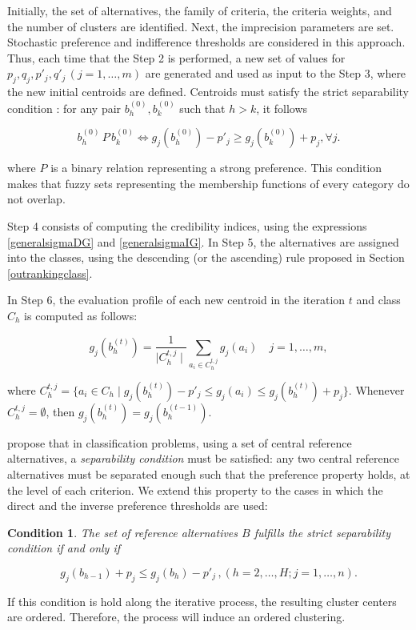 \documentclass[]{elsarticle}
\theoremstyle{definition}
\newtheorem{cond}{Condition}
\begin{document}
Initially, the set of alternatives, the family of criteria, the criteria weights, and the number of clusters are identified.  Next, the imprecision parameters are set. Stochastic preference and indifference thresholds are considered in this approach. Thus, each time that the Step 2 is performed, a new set of values for $p_j,q_j,p'_j,q'_j \,(j=1,\ldots,m)$ are generated and used as input to the Step 3, where the new initial centroids are defined. Centroids  must satisfy the strict separability condition \citep{roy2012}:  for any pair $b_h^{(0)}, b_k^{(0)}$ such that $h>k$, it follows 

\begin{equation}
b_h^{(0)} \,P\, b_k^{(0)} \Leftrightarrow g_j(b_h^{(0)})-p'_j \geq g_j(b_k^{(0)})+p_j, \forall j.
\end{equation}

\noindent
where $P$ is a binary relation representing a strong preference.  This condition makes that fuzzy sets representing the membership functions of every category do not overlap. 


Step 4 consists of computing the credibility indices, using the expressions \eqref{generalsigmaDG} and  \eqref{generalsigmaIG}. In Step 5, the alternatives are assigned into the classes, using the descending (or the ascending) rule proposed in Section \ref{outrankingclass}.

In Step 6, the evaluation profile of each new centroid in the iteration $t$ and class $C_h$ is computed as follows:

\begin{equation}
g_j(b_h^{(t)}) = \frac{1}{\mid C_h^{t,j} \mid} \sum_{a_i \in C_h^{t,j}} g_j(a_i) \quad j=1,\ldots,m,\label{newcentroid}
\end{equation}

\noindent
where $C_h^{t,j}=\{a_i \in C_h \mid g_j(b_h^{(t)})-p'_j\leq g_j(a_i) \leq g_j(b_h^{(t)})+p_j\}$.  Whenever $C_h^{t,j}=\emptyset$, then $g_j(b_h^{(t)})=g_j(b_h^{(t-1)})$.   


{\color{blue}\cite{roy2012} propose that in classification problems, using a set of central reference alternatives, a \emph{separability condition} must be satisfied: any two central reference alternatives must be separated enough such that the preference property holds, at the level of each criterion. We extend this property to the cases in which the direct and the inverse preference thresholds are used:

\begin{cond}
\emph{The set of reference alternatives $B$ fulfills the strict separability condition if and only if}

\begin{equation}
g_j(b_{h-1})+p_j \leq g_j(b_h)-p'_j \,,(h=2,\ldots,H; j=1,\ldots,n). \label{separability}
\end{equation}

\end{cond}

\noindent
If this condition is hold along the iterative process, the resulting cluster centers are ordered.  Therefore, the  process will induce an ordered clustering.
}
\end{document}
